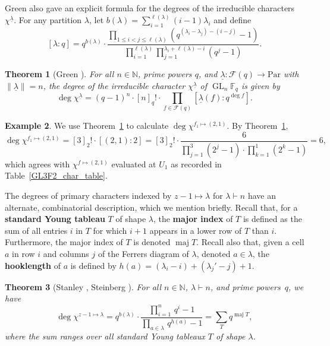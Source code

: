 \documentclass[10pt]{article}
\newtheorem{theorem}{Theorem}[section]
\theoremstyle{definition}
\newtheorem{example}[theorem]{Example}
\DeclareMathOperator{\GL}{GL}
\DeclareMathOperator{\maj}{maj}
\newcommand{\F}{\mathbb{F}}
\newcommand{\CF}{\mathcal{F}}
\newcommand{\N}{\mathbb{N}}
\newcommand{\myemph}{\textbf}
\newcommand{\Par}{\text{Par}}
\newcommand{\ulambda}{{\underline{\lambda}}}
\begin{document}
Green also gave an explicit formula for the degrees of the irreducible characters $\chi^\ulambda$.
For any partition $\lambda$, let $b(\lambda) = \sum_{i=1}^{\ell(\lambda)} (i-1)\lambda_i$ and define
\begin{equation}
\left [ \lambda : q \right ] = q^{b(\lambda)} \cdot \frac{\prod_{1 \leq i < j \leq \ell(\lambda)} \left ( q^{(\lambda_i - \lambda_j) - (i - j)} - 1 \right )}{\prod_{i=1}^{\ell(\lambda)} \prod_{j=1}^{\lambda_i + \ell(\lambda) - i} (q^j-1)}.
\end{equation}

\begin{theorem}[Green {\cite[Theorem~14]{green}}]
\label{degrees}
For all \(n \in \N\), prime powers \(q\), and $\ulambda : \CF (q) \to \Par$ with $\| \ulambda \| = n$,
the degree of the irreducible character $\chi^\ulambda$ of $\GL_n \F_q$ is given by
\begin{equation}
\deg \chi^\ulambda = (q-1)^n \cdot [n]_q! \cdot \prod_{f \in \CF (q)} \left [ \ulambda (f) : q^{\deg f} \right ].
\end{equation}
\end{theorem}

\begin{example}
We use Theorem~\ref{degrees} to calculate $\deg \chi^{f_1 \mapsto (2,1)}$.
By Theorem~\ref{degrees},
\[
\deg \chi^{f_1 \mapsto (2,1)}
=
[3]_2! \cdot [(2,1): 2]
=
[3]_2! \cdot \frac{6}{\prod_{j=1}^3 (2^j-1) \cdot \prod_{k=1}^1 (2^k-1)} = 6,
\]
which agrees with \(\chi^{f \mapsto (2,1)}\) evaluated at \(U_1\) as recorded in Table~\ref{GL3F2_char_table}.
\end{example}



The degrees of primary characters indexed by \(z-1 \mapsto \lambda\) for \(\lambda \vdash n\) have an alternate, combinatorial description, which we mention briefly.
Recall that, for a \myemph{standard Young tableau} \(T\) of shape \(\lambda\), the \myemph{major index} of \(T\) is defined as the sum of all entries \(i\) in \(T\) for which \(i + 1\) appears in a lower row of \(T\) than \(i\).
Furthermore, the major index of \(T\) is denoted \(\maj T\).
Recall also that, given a cell \(a\) in row \(i\) and columns \(j\) of the Ferrers diagram of \(\lambda\), denoted \(a \in \lambda\), the \myemph{hooklength} of \(a\) is defined by \(h(a) = (\lambda_i - i) + (\lambda_j' - j) + 1\).
\begin{theorem}[Stanley \cite{EC2}, Steinberg \cite{steinberg}]
For all \(n \in \N\), \(\lambda \vdash n\), and prime powers~\(q\), we have
\begin{equation}
\deg \chi^{z-1 \mapsto \lambda} = q^{b(\lambda)} \cdot \frac{\prod_{i=1}^n \, q^i - 1}{\prod_{a \in \lambda} \, q^{h(a)} - 1} = \sum_{T} q^{\maj T},
\end{equation}
where the sum ranges over all standard Young tableaux \(T\) of shape \(\lambda\).
\end{theorem}
\end{document}

